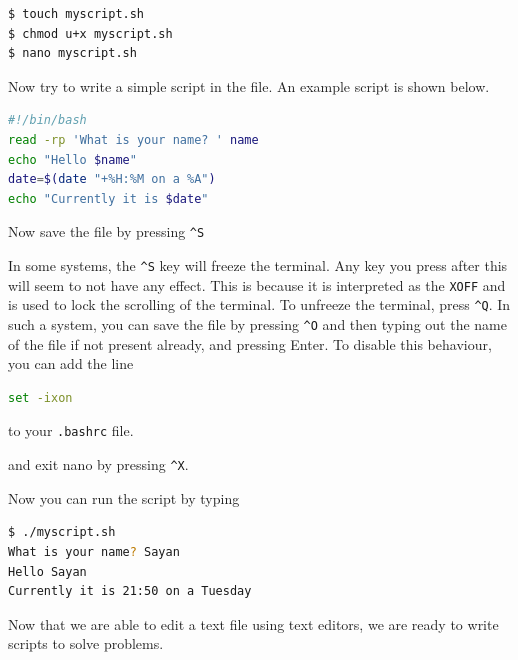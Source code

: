 \begin{lstlisting}[language=bash]
$ touch myscript.sh
$ chmod u+x myscript.sh
$ nano myscript.sh
\end{lstlisting}

Now try to write a simple script in the file.
An example script is shown below.

\begin{lstlisting}[language=bash]
#!/bin/bash
read -rp 'What is your name? ' name
echo "Hello $name"
date=$(date "+%H:%M on a %A")
echo "Currently it is $date"
\end{lstlisting}


Now save the file by pressing \texttt{\textasciicircum S}
\begin{remark}
  In some systems, the \texttt{\textasciicircum S} key
  will freeze the terminal. Any key you press after this
  will seem to not have any effect.
  This is because it is interpreted as the \texttt{XOFF}
  and is used to lock the scrolling of the terminal.
  To unfreeze the terminal, press \texttt{\textasciicircum Q}.
  In such a system, you can save the file by pressing
  \texttt{\textasciicircum O} and then typing out the
  name of the file if not present already, and pressing
  Enter.
  To disable this behaviour, you can add the line
  \begin{lstlisting}[language=bash]
  set -ixon \end{lstlisting}
  to your \texttt{.bashrc} file.
\end{remark}
and exit nano by pressing \texttt{\textasciicircum X}.

Now you can run the script by typing

\begin{lstlisting}[language=bash]
$ ./myscript.sh
What is your name? Sayan
Hello Sayan
Currently it is 21:50 on a Tuesday
\end{lstlisting}

Now that we are able to edit a text file using text editors,
we are ready to write scripts to solve problems.
